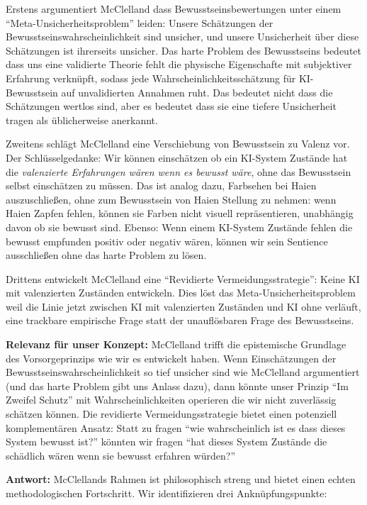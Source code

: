 \documentclass[acmlarge, noacm]{acmart}
\begin{document}
Erstens argumentiert McClelland dass Bewusstseinsbewertungen unter einem ``Meta-Unsicherheitsproblem'' leiden: Unsere Schätzungen der Bewusstseinswahrscheinlichkeit sind unsicher, und unsere Unsicherheit über diese Schätzungen ist ihrerseits unsicher. Das harte Problem des Bewusstseins bedeutet dass uns eine validierte Theorie fehlt die physische Eigenschafte mit subjektiver Erfahrung verknüpft, sodass jede Wahrscheinlichkeitsschätzung für KI-Bewusstsein auf unvalidierten Annahmen ruht. Das bedeutet nicht dass die Schätzungen wertlos sind, aber es bedeutet dass sie eine tiefere Unsicherheit tragen als üblicherweise anerkannt.

Zweitens schlägt McClelland eine Verschiebung von Bewusstsein zu Valenz vor. Der Schlüsselgedanke: Wir können einschätzen ob ein KI-System Zustände hat die \textit{valenzierte Erfahrungen wären wenn es bewusst wäre}, ohne das Bewusstsein selbst einschätzen zu müssen. Das ist analog dazu, Farbsehen bei Haien auszuschließen, ohne zum Bewusstsein von Haien Stellung zu nehmen: wenn Haien Zapfen fehlen, können sie Farben nicht visuell repräsentieren, unabhängig davon ob sie bewusst sind. Ebenso: Wenn einem KI-System Zustände fehlen die bewusst empfunden positiv oder negativ wären, können wir sein Sentience ausschließen ohne das harte Problem zu lösen.

Drittens entwickelt McClelland eine ``Revidierte Vermeidungsstrategie'': Keine KI mit valenzierten Zuständen entwickeln. Dies löst das Meta-Unsicherheitsproblem weil die Linie jetzt zwischen KI mit valenzierten Zuständen und KI ohne verläuft, eine trackbare empirische Frage statt der unauflösbaren Frage des Bewusstseins.

\textbf{Relevanz für unser Konzept:} McClelland trifft die epistemische Grundlage des Vorsorgeprinzips wie wir es entwickelt haben. Wenn Einschätzungen der Bewusstseinswahrscheinlichkeit so tief unsicher sind wie McClelland argumentiert (und das harte Problem gibt uns Anlass dazu), dann könnte unser Prinzip ``Im Zweifel Schutz'' mit Wahrscheinlichkeiten operieren die wir nicht zuverlässig schätzen können. Die revidierte Vermeidungsstrategie bietet einen potenziell komplementären Ansatz: Statt zu fragen ``wie wahrscheinlich ist es dass dieses System bewusst ist?'' könnten wir fragen ``hat dieses System Zustände die schädlich wären wenn sie bewusst erfahren würden?''

\textbf{Antwort:} McClellands Rahmen ist philosophisch streng und bietet einen echten methodologischen Fortschritt. Wir identifizieren drei Anknüpfungspunkte:
\end{document}

